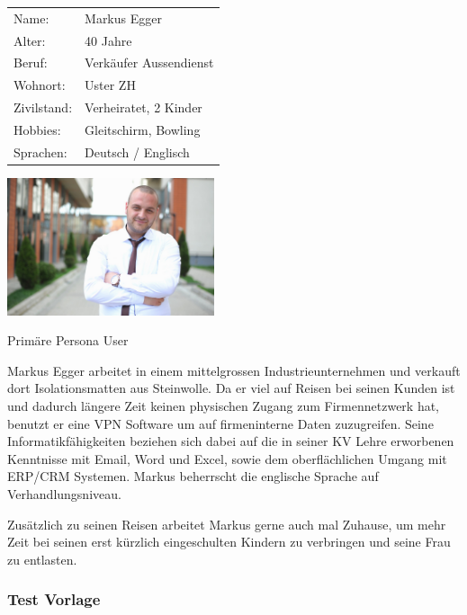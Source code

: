 \noindent\begin{minipage}[t]{0.5\textwidth}
\vspace{0pt}
    \begin{tabular}{ l l }
        Name: & Markus Egger \\
        Alter: & 40 Jahre \\
        Beruf: & Verkäufer Aussendienst \\
        Wohnort: & Uster ZH \\
        Zivilstand: & Verheiratet, 2 Kinder \\
        Hobbies: & Gleitschirm, Bowling \\
        Sprachen: & Deutsch / Englisch \\
    \end{tabular}
\end{minipage}
\hfill
\begin{minipage}[t]{0.5\textwidth}
\vspace{0pt}
    \includegraphics[width=230px]{images/persona_business.jpg}
    \caption[Primäre Persona User]{Primäre Persona User}
\end{minipage}


Markus Egger arbeitet in einem mittelgrossen Industrieunternehmen und verkauft dort Isolationsmatten aus Steinwolle. Da er viel auf Reisen bei seinen Kunden ist und dadurch längere Zeit keinen physischen Zugang zum Firmennetzwerk hat, benutzt er eine VPN Software um auf firmeninterne Daten zuzugreifen. Seine Informatikfähigkeiten beziehen sich dabei auf die in seiner KV Lehre erworbenen Kenntnisse mit Email, Word und Excel, sowie dem oberflächlichen Umgang mit ERP/CRM Systemen.
Markus beherrscht die englische Sprache auf Verhandlungsniveau.

Zusätzlich zu seinen Reisen arbeitet Markus gerne auch mal Zuhause, um mehr Zeit bei seinen erst kürzlich eingeschulten Kindern zu verbringen und seine Frau zu entlasten.

\subsubsection{Test Vorlage}


